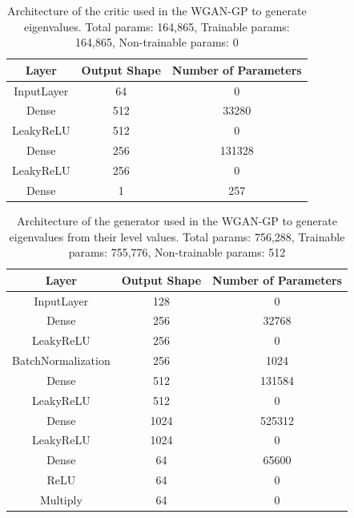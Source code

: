 \documentclass[11pt,a4paper,twoside]{report}
\begin{document}
\begin{table}[]
  \centering
  \begin{tabular}{c c c}
      \hline
      \textbf{Layer} & \textbf{Output Shape} & \textbf{Number of Parameters} \\ \hline
      InputLayer            & 64            & 0                 \\
      Dense                 & 512           & 33280             \\
      LeakyReLU             & 512           & 0                 \\
      Dense                 & 256           & 131328            \\
      LeakyReLU             & 256           & 0                 \\
      Dense                 & 1             & 257               \\
  \end{tabular}
  \caption{Architecture of the critic used in the WGAN-GP to generate eigenvalues. Total params: 164,865, Trainable params: 164,865, Non-trainable params: 0}
  \label{tab:evals_critic_WGANGP_architecture}
\end{table}

\begin{table}[]
  \centering
  \begin{tabular}{c c c}
      \hline
      \textbf{Layer} & \textbf{Output Shape} & \textbf{Number of Parameters} \\ \hline
      InputLayer            & 128           & 0                 \\
      Dense                 & 256           & 32768             \\
      LeakyReLU             & 256           & 0                 \\
      BatchNormalization    & 256           & 1024              \\
      Dense                 & 512           & 131584            \\
      LeakyReLU             & 512           & 0                 \\
      Dense                 & 1024          & 525312            \\
      LeakyReLU             & 1024          & 0                 \\
      Dense                 & 64            & 65600             \\
      ReLU                  & 64            & 0                 \\
      Multiply              & 64            & 0                 \\
  \end{tabular}
  \caption{Architecture of the generator used in the WGAN-GP to generate eigenvalues from their level values. Total params: 756,288, Trainable params: 755,776, Non-trainable params: 512}
  \label{tab:evals_dB_generator_WGANGP_architecture}
\end{table}
\end{document}
